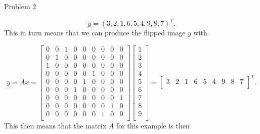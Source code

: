 \begin{problem}{Problem 2}
\begin{highlight}
        \setcounter{equation}{0}
        \begin{equation}
            y = (3,2,1,6,5,4,9,8,7)^{T}.
        \end{equation}
        This in turn means that we can produce the flipped image $y$ with

        \begin{equation}
            y = Ax = 
            \begin{bmatrix}
                0 & 0 & 1 & 0 & 0 & 0 & 0 & 0 & 0 \\
                0 & 1 & 0 & 0 & 0 & 0 & 0 & 0 & 0 \\
                1 & 0 & 0 & 0 & 0 & 0 & 0 & 0 & 0 \\
                0 & 0 & 0 & 0 & 0 & 1 & 0 & 0 & 0 \\
                0 & 0 & 0 & 0 & 1 & 0 & 0 & 0 & 0 \\
                0 & 0 & 0 & 1 & 0 & 0 & 0 & 0 & 0 \\
                0 & 0 & 0 & 0 & 0 & 0 & 0 & 0 & 1 \\
                0 & 0 & 0 & 0 & 0 & 0 & 0 & 1 & 0 \\
                0 & 0 & 0 & 0 & 0 & 0 & 1 & 0 & 0 \\
            \end{bmatrix}
            \begin{bmatrix}
                1 \\
                2 \\
                3 \\
                4 \\
                5 \\
                6 \\
                7 \\
                8 \\
                9 \\
            \end{bmatrix}
            = 
            \begin{bmatrix}
                3 & 2 & 1 & 6 & 5 & 4 & 9 & 8 & 7 \\
            \end{bmatrix}^{T}.
        \end{equation}
        This then means that the matrix $A$ for this example is then


\end{highlight}
\end{problem}
